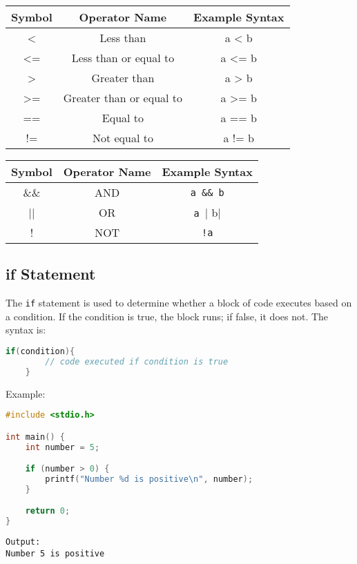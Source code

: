 \begin{center}
\begin{tabular}{|c|c|c|}
\hline
\textbf{Symbol} & \textbf{Operator Name} & \textbf{Example Syntax} \\ \hline
<    & Less than                & a < b  \\ \hline
<=   & Less than or equal to    & a <= b \\ \hline
>    & Greater than             & a > b  \\ \hline
>=   & Greater than or equal to & a >= b \\ \hline
==   & Equal to                 & a == b \\ \hline
!=   & Not equal to             & a != b \\ \hline
\end{tabular}

\begin{tabular}{|c|c|c|}
\hline
\textbf{Symbol} & \textbf{Operator Name} & \textbf{Example Syntax} \\ \hline
\&\&    & AND  & \verb|a && b| \\ \hline
||      & OR   & \verb|a || b| \\ \hline
!       & NOT  & \verb|!a| \\ \hline
\end{tabular}
\end{center}

\subsection{if Statement}

The \verb|if| statement is used to determine whether a block of code executes based on a condition.  
If the condition is true, the block runs; if false, it does not.  
The syntax is:

{
\captionsetup[lstlisting]{labelformat=empty, justification=raggedright, singlelinecheck=false}
\begin{lstlisting}[language=c, caption={Syntax}]
    if(condition){
        // code executed if condition is true
    }
\end{lstlisting}
}

Example:
\begin{lstlisting}[language=c]
#include <stdio.h>

int main() {
	int number = 5;

	if (number > 0) {
		printf("Number %d is positive\n", number);
	}

	return 0;
}
\end{lstlisting}
\begin{verbatim}
Output:
Number 5 is positive
\end{verbatim}

